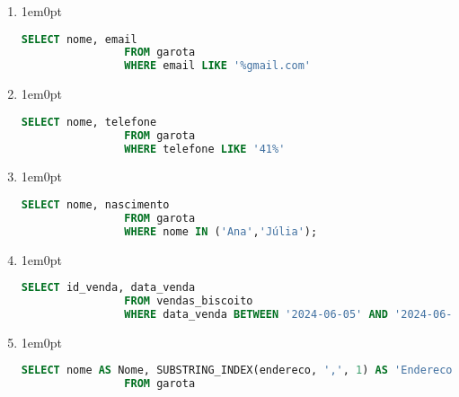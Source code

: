 \documentclass{article}
\begin{document}
\begin{enumerate}[label=\alph*.]
\begin{enumerate}[label=\roman*., labelsep=0.5em, leftmargin=*]
        \item 
        \begin{adjustwidth}{1em}{0pt}
            \begin{lstlisting}[language=SQL]
                SELECT nome, email
                FROM garota
                WHERE email LIKE '%gmail.com'
            \end{lstlisting}
        \end{adjustwidth}

        \item 
        \begin{adjustwidth}{1em}{0pt}
            \begin{lstlisting}[language=SQL]
                SELECT nome, telefone
                FROM garota
                WHERE telefone LIKE '41%'
            \end{lstlisting}
        \end{adjustwidth}

        \item 
        \begin{adjustwidth}{1em}{0pt}
            \begin{lstlisting}[language=SQL]
                SELECT nome, nascimento
                FROM garota
                WHERE nome IN ('Ana','Júlia');
            \end{lstlisting}
        \end{adjustwidth}

        \item 
        \begin{adjustwidth}{1em}{0pt}
            \begin{lstlisting}[language=SQL]
                SELECT id_venda, data_venda
                FROM vendas_biscoito
                WHERE data_venda BETWEEN '2024-06-05' AND '2024-06-08'
            \end{lstlisting}
        \end{adjustwidth}

        \item 
        \begin{adjustwidth}{1em}{0pt}
            \begin{lstlisting}[language=SQL]
                SELECT nome AS Nome, SUBSTRING_INDEX(endereco, ',', 1) AS 'Endereco (Logradouro)', SUBSTRING_INDEX(endereco, ',', -1) AS 'Endereco (Número)'
                FROM garota                
            \end{lstlisting}
        \end{adjustwidth}


\end{enumerate}
\end{enumerate}
\end{document}
